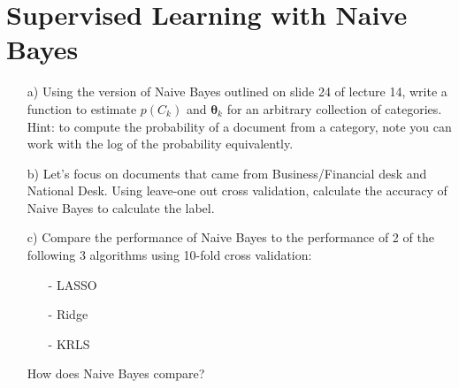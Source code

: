 \documentclass[12pt,letterpaper]{article}
\begin{document}
\section{Supervised Learning with Naive Bayes}

\begin{itemize}
\item[a)] Using the version of Naive Bayes outlined on slide 24 of lecture 14, write a function to estimate $p(C_{k})$ and $\boldsymbol{\theta}_{k}$ for an arbitrary collection of categories.  Hint: to compute the probability of a document from a category, note you can work with the log of the probability equivalently.  
\item[b)] Let's focus on documents that came from Business/Financial desk and National Desk.  Using leave-one out cross validation, calculate the accuracy of Naive Bayes to calculate the label.
\item[c)] Compare the performance of Naive Bayes to the performance of 2 of the following 3 algorithms using 10-fold cross validation:
\begin{itemize}
\item[-] LASSO 
\item[-] Ridge 
\item[-] KRLS 
\end{itemize}
How does Naive Bayes compare? 
\end{itemize}
\end{document}
